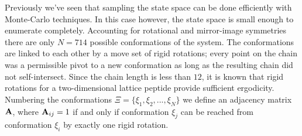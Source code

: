 Previously we've seen that sampling the state space can be done efficiently with Monte-Carlo techniques. In this case however, the state space is small enough to enumerate completely. Accounting for rotational and mirror-image symmetries there are only $N=714$ possible conformations of the system. The conformations are linked to each other by a move set of rigid rotations; every point on the chain was a permissible pivot to a new conformation as long as the resulting chain did not self-intersect. Since the chain length is less than $12$, it is known that rigid rotations for a two-dimensional lattice peptide provide sufficient ergodicity.\cite{chan_effects_1990} Numbering the conformations $\Xi=\{ \xi_1, \xi_2, ..., \xi_N \}$ we define an adjacency matrix ${\bf A}$, where ${\bf A}_{ij}=1$ if and only if conformation $\xi_j$ can be reached from conformation $\xi_i$ by exactly one rigid rotation.

